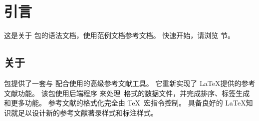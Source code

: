 

\section{引言}
\label{int}

这是关于 \biblatex 包的语法文档，使用范例文档参考文档。
快速开始，请浏览 节。



\subsection{关于 \biblatex}
\label{int:abt}



\biblatex 包提供了一套与 \latex 配合使用的高级参考文献工具。
它重新实现了 \LaTeX 提供的参考文献功能。
该包使用后端程序 \biber 来处理\bibtex\ 格式的数据文件，并完成排序、标签生成和更多功能。
参考文献的格式化完全由 \TeX\ 宏指令控制。
具备良好的 \LaTeX 知识就足以设计新的参考文献著录样式和标注样式。

